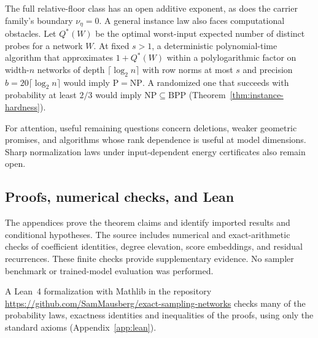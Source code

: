 The full relative-floor class has an open additive exponent,
as does the carrier family's boundary $\nu_\eta=0$. A general instance
law also faces computational obstacles. Let $Q^*(W)$ be the optimal
worst-input expected number of distinct probes for a network $W$.
At fixed $s>1$, a deterministic polynomial-time algorithm that
approximates $1+Q^*(W)$ within a polylogarithmic factor on width-$n$
networks of depth $\lceil\log_2n\rceil$ with row norms at most $s$
and precision $b=20\lceil\log_2n\rceil$ would imply
$\mathrm P=\mathrm{NP}$. A randomized one that succeeds with
probability at least $2/3$ would imply
$\mathrm{NP}\subseteq\mathrm{BPP}$ (Theorem~\ref{thm:instance-hardness}).

For attention, useful remaining questions concern deletions,
weaker geometric promises, and algorithms whose rank dependence
is useful at model dimensions. Sharp normalization laws under input-dependent energy certificates
also remain open.

\subsection{Proofs, numerical checks, and Lean}

The appendices prove the theorem claims and identify imported
results and conditional hypotheses. The source includes numerical
and exact-arithmetic checks of coefficient identities, degree
elevation, score embeddings, and residual recurrences. These finite
checks provide supplementary evidence. No sampler benchmark or
trained-model evaluation was performed.

A Lean~4 formalization with Mathlib in the repository
\url{https://github.com/SamMausberg/exact-sampling-networks} checks many
of the probability laws, exactness identities and inequalities of the proofs,
using only the standard axioms (Appendix~\ref{app:lean}).
